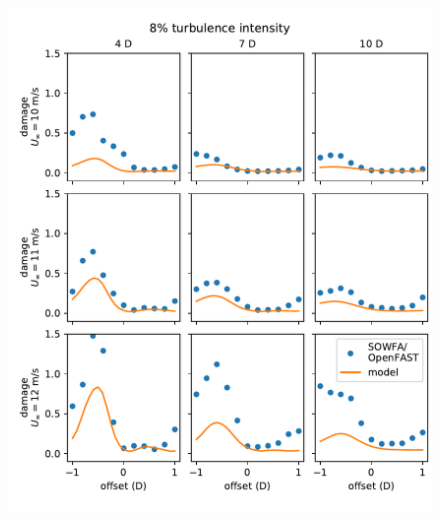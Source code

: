 \documentclass[11pt,letterpaper]{article}
\begin{document}
% 
\begin{figure}
    \centering
    \includegraphics{images/highTI_damage.pdf}
    \caption{}
    \label{high_TI}
\end{figure}
% 
\end{document}
